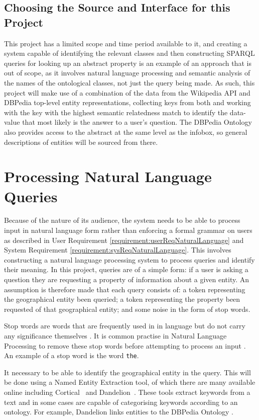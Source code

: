 \documentclass[authoryearcitations]{UoYCSproject}
\begin{document}
\subsection{Choosing the Source and Interface for this Project}
This project has a limited scope and time period available to it, and creating a system capable of identifying the relevant classes and then constructing SPARQL queries for looking up an abstract property is an example of an approach that is out of scope, as it involves natural language processing and semantic analysis of the names of the ontological classes, not just the query being made.  As such, this project will make use of a combination of the data from the Wikipedia API and DBPedia top-level entity representations, collecting keys from both and working with the key with the highest semantic relatedness match to identify the data-value that most likely is the answer to a user's question.  The DBPedia Ontology also provides access to the abstract at the same level as the infobox, so general descriptions of entities will be sourced from there.

\section{Processing Natural Language Queries}
Because of the nature of its audience, the system needs to be able to process input in natural language form rather than enforcing a formal grammar on users as described in User Requirement \ref{requirement:userReqNaturalLanguage} and System Requirement \ref{requirement:sysReqNaturalLanguage}. This involves constructing a natural language processing system to process queries and identify their meaning. In this project, queries are of a simple form: if a user is asking a question they are requesting a property of information about a given entity. An assumption is therefore made that each query consists of: a token representing the geographical entity been queried; a token representing the property been requested of that geographical entity; and some noise in the form of stop words.

Stop words are words that are frequently used in in language but do not carry any significance themselves \cite{dataMiningStopWords}. It is common practise in Natural Language Processing to remove these stop words before attempting to process an input \cite{dataMiningStopWords}. An example of a stop word is the word \texttt{the}.

It necessary to be able to identify the geographical entity in the query. This will be done using a Named Entity Extraction tool, of which there are many available online including Cortical~\cite{serviceCorticalNex} and Dandelion~\cite{serviceDandelionNex}. These tools extract keywords from a text and in some cases are capable of categorising keywords according to an ontology. For example, Dandelion links entities to the DBPedia Ontology \cite{dandelionNex}.
\end{document}
